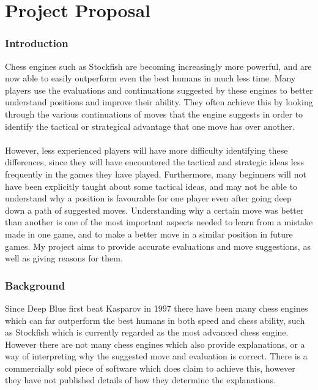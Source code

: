 \documentclass[12pt,a4paper]{article}
\begin{document}
\part*{Project Proposal}
\section*{Introduction}
Chess engines such as Stockfish are becoming increasingly more powerful, and are now able to easily outperform even the best humans in much less time. Many players use the evaluations and continuations suggested by these engines to better understand positions and improve their ability. They often achieve this by looking through the various continuations of moves that the engine suggests in order to identify the tactical or strategical advantage that one move has over another.
\\\\
However, less experienced players will have more difficulty identifying these differences, since they will have encountered the tactical and strategic ideas less frequently in the games they have played. Furthermore, many beginners will not have been explicitly taught about some tactical ideas, and may not be able to understand why a position is favourable for one player even after going deep down a path of suggested moves. Understanding why a certain move was better than another is one of the most important aspects needed to learn from a mistake made in one game, and to make a better move in a similar position in future games. My project aims to provide accurate evaluations and move suggestions, as well as giving reasons for them.

\section*{Background}
Since Deep Blue first beat Kasparov in 1997 there have been many chess engines which can far outperform the best humans in both speed and chess ability, such as Stockfish which is currently regarded as the most advanced chess engine. However there are not many chess engines which also provide explanations, or a way of interpreting why the suggested move and evaluation is correct. There is a commercially sold piece of software which does claim to achieve this, however they have not published details of how they determine the explanations.
\end{document}
